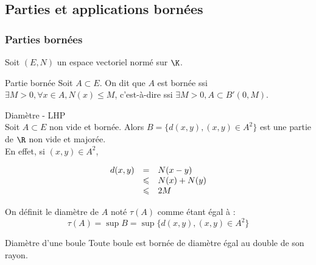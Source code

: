 \subsection{Parties et applications bornées}

\subsubsection{Parties bornées}
Soit $(E, N)$ un espace vectoriel normé sur $\K$. 

\begin{definition}{Partie bornée}{}
    Soit $A \subset E$. On dit que $A$ est bornée ssi $\exists M > 0, \forall x \in A, N(x) \leqslant M$, 
    c'est-à-dire ssi $\exists M > 0, A \subset B'(0, M)$.
\end{definition}

\begin{theoreme}{Diamètre - LHP}{}
    \\Soit $A \subset E$ non vide et bornée. 
    Alors $B = \{d(x, y), (x, y) \in A^2\}$ est une partie de $\R$ non vide et majorée.\\

    En effet, si $(x, y) \in A^2$, 

    \[
    \begin{array}{rcl}
        d(x, y) & = & N(x - y) \\
        \space & \leqslant & N(x) + N(y) \\
        \space & \leqslant & 2 M \\
    \end{array}
    \]

    On définit le diamètre de $A$ noté $\tau(A)$ comme étant égal à : 
    \[\tau(A) = \sup B = \sup \{d(x, y), (x, y) \in A^2\}\]
\end{theoreme}

\begin{proposition}{Diamètre d'une boule}{}
    Toute boule est bornée de diamètre égal au double de son rayon.
\end{proposition}


